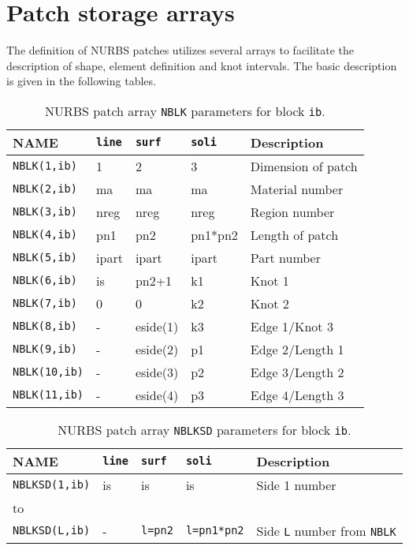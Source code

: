 \chapter[Patch storage arrays]{Patch storage arrays}
\label{appxa}

The definition of NURBS patches utilizes several arrays to facilitate
the description of shape, element definition and knot intervals.
The basic description is given in the following tables.

\begin{table}[!hb]
\begin{center}
\begin{tabular}{| l || l | l | l || p{2.5in} | |} \hline
NAME & {\tt line} & {\tt surf} & {\tt soli} & Description \\ \hline
{\tt NBLK(1,ib)}  & 1     & 2        & 3 & Dimension of patch \\ 
{\tt NBLK(2,ib)}  & ma    & ma       & ma & Material number \\ 
{\tt NBLK(3,ib)}  & nreg  & nreg     & nreg & Region number \\ 
{\tt NBLK(4,ib)}  & pn1   & pn2      & pn1*pn2 & Length of patch \\ 
{\tt NBLK(5,ib)}  & ipart & ipart    & ipart & Part number \\ 
{\tt NBLK(6,ib)}  & is    & pn2+1    & k1 & Knot 1 \\ 
{\tt NBLK(7,ib)}  & 0     & 0        & k2 & Knot 2 \\ 
{\tt NBLK(8,ib)}  & -     & eside(1) & k3 & Edge 1/Knot 3 \\ 
{\tt NBLK(9,ib)}  & -     & eside(2) & p1 & Edge 2/Length 1 \\ 
{\tt NBLK(10,ib)} & -     & eside(3) & p2 & Edge 3/Length 2 \\ 
{\tt NBLK(11,ib)} & -     & eside(4) & p3 & Edge 4/Length 3 \\ \hline
\end{tabular}
\caption{NURBS patch array \texttt{NBLK} parameters for block \texttt{ib}.
\label{tabin1} }
\end{center}
\end{table}

\begin{table}[!t]
\begin{center}
\begin{tabular}{| l || l | l | l || p{2.5in} | |} \hline
NAME & {\tt line} & {\tt surf} & {\tt soli} & Description \\ \hline
{\tt NBLKSD(1,ib)}  & is  & is        & is & Side 1 number \\ 
 to & & & & \\
{\tt NBLKSD(L,ib)}  & - & \texttt{l=pn2} & \texttt{l=pn1*pn2} & Side
{\tt L} number from \texttt{NBLK}\\ \hline 
\end{tabular}
\caption{NURBS patch array \texttt{NBLKSD} parameters for block \texttt{ib}.
\label{tabin2} }
\end{center}
\end{table}


